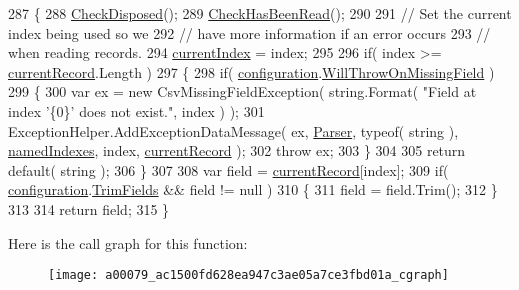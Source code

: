 \begin{DoxyCode}
287         \{
288             \hyperlink{a00079_a6fa45a46ed1322dc1872ca2321b5edbc}{CheckDisposed}();
289             \hyperlink{a00079_a2d9249171ed1568e45d152766d364c31}{CheckHasBeenRead}();
290 
291             \textcolor{comment}{// Set the current index being used so we}
292             \textcolor{comment}{// have more information if an error occurs}
293             \textcolor{comment}{// when reading records.}
294             \hyperlink{a00079_a56e974bc7e2242912e956393e831e166}{currentIndex} = index;
295 
296             \textcolor{keywordflow}{if}( index >= \hyperlink{a00079_ab2bfef15784add66e441c9d3a0d73751}{currentRecord}.Length )
297             \{
298                 \textcolor{keywordflow}{if}( \hyperlink{a00079_a695622911e45cbac8d67dcbd9a3e2967}{configuration}.\hyperlink{a00065_a13cb7999b190a01177134faa52dfa3db}{WillThrowOnMissingField} )
299                 \{
300                     var ex = \textcolor{keyword}{new} CsvMissingFieldException( \textcolor{keywordtype}{string}.Format( \textcolor{stringliteral}{"Field at index '\{0\}' does not
       exist."}, index ) );
301                     ExceptionHelper.AddExceptionDataMessage( ex, \hyperlink{a00079_a67874ae540cf6cf32522a38167a3f3b6}{Parser}, typeof( \textcolor{keywordtype}{string} ), 
      \hyperlink{a00079_a3114f49bd2b3c4966f4b15a310747aeb}{namedIndexes}, index, \hyperlink{a00079_ab2bfef15784add66e441c9d3a0d73751}{currentRecord} );
302                     \textcolor{keywordflow}{throw} ex;
303                 \}
304 
305                 \textcolor{keywordflow}{return} \textcolor{keywordflow}{default}( \textcolor{keywordtype}{string} );
306             \}
307 
308             var field = \hyperlink{a00079_ab2bfef15784add66e441c9d3a0d73751}{currentRecord}[index];
309             \textcolor{keywordflow}{if}( \hyperlink{a00079_a695622911e45cbac8d67dcbd9a3e2967}{configuration}.\hyperlink{a00065_a100f3a2268218bfba3088f4ca1d6a7ad}{TrimFields} && field != null )
310             \{
311                 field = field.Trim();
312             \}
313 
314             \textcolor{keywordflow}{return} field;
315         \}
\end{DoxyCode}


Here is the call graph for this function\-:
\nopagebreak
\begin{figure}[H]
\begin{center}
\leavevmode
\texttt{[image: a00079\_ac1500fd628ea947c3ae05a7ce3fbd01a\_cgraph]}
\end{center}
\end{figure}





